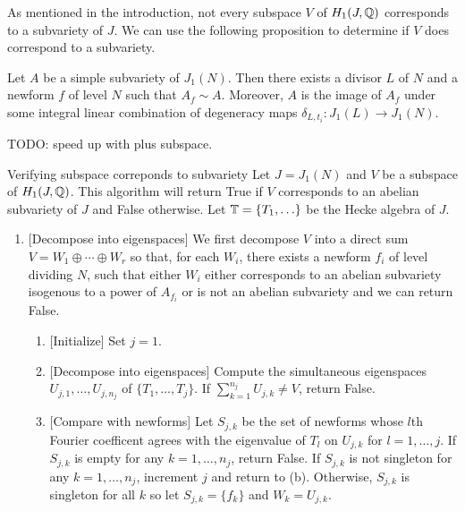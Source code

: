 \documentclass{article}
\begin{document}
As mentioned in the introduction, not every subspace $V$ of $H_1(J, \mathbb{Q})$
corresponds to a subvariety of $J$. We can use the following proposition to
determine if $V$ does correspond to a subvariety.

\begin{proposition}
    Let $A$ be a simple subvariety of $J_1(N)$. Then there exists a divisor $L$
    of $N$ and a newform $f$ of level $N$ such that $A_f \sim A$. Moreover, $A$
    is the image of $A_f$ under some integral linear combination of degeneracy
    maps $\delta_{L, t_i}:J_1(L)\to J_1(N)$.
\end{proposition}

TODO: speed up with plus subspace.
\begin{algorithm}{Verifying subspace correponds to subvariety}
    Let $J=J_1(N)$ and $V$ be a subspace of $H_1(J, \mathbb{Q})$. This algorithm will
    return True if $V$ corresponds to an abelian subvariety of $J$ and
    False otherwise. Let $\mathbb{T}=\{T_1,\ldots\}$ be the Hecke algebra of $J$.
    \begin{enumerate}
        \item{} [Decompose into eigenspaces] 
            We first decompose $V$ into a direct sum $V=W_1\oplus \cdots \oplus
            W_r$ so that, for each $W_i$, there exists a newform $f_i$ of level
            dividing $N$, such that either $W_i$ either corresponds to an
            abelian subvariety isogenous to a power of $A_{f_i}$ or is not an
            abelian subvariety and we can return False.
            \begin{enumerate}
                \item{} [Initialize]
                    Set $j=1$.
                \item{} [Decompose into eigenspaces]
                    Compute the simultaneous eigenspaces $U_{j,1},\ldots,U_{j,
                    n_j}$ of $\{T_1,\ldots,T_j\}$. If $\sum_{k=1} ^{n_j}
                    U_{j, k}\neq V$, return False.
                \item{} [Compare with newforms]
                    Let $S_{j,k}$ be the set of newforms whose $l$th Fourier
                    coefficent agrees with the eigenvalue of $T_l$ on $U_{j,
                    k}$ for $l=1,\ldots,j$. If $S_{j, k}$ is empty for any
                    $k=1,\ldots,n_j$, return False. If $S_{j,k}$ is not
                    singleton for any $k=1,\ldots, n_j$, increment $j$ and
                    return to (b).  Otherwise, $S_{j,k}$ is singleton for all
                    $k$ so let $S_{j,k}=\{f_k\}$ and $W_k=U_{j,k}$.

\end{enumerate}
\end{enumerate}
\end{algorithm}
\end{document}
